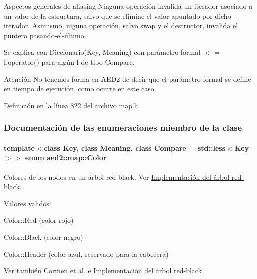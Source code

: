 \begin{DoxyParagraph}{\-Aspectos generales de aliasing}
\-Ninguna operación invalida un iterador asociado a un valor de la estructura, salvo que se elimine el valor apuntado por dicho iterador. \-Asimismo, niguna operación, salvo swap y el destructor, invalida el puntero pasando-\/el-\/último.
\end{DoxyParagraph}
\begin{DoxyParagraph}{\-Se explica con}
\-Diccionario(\-Key, \-Meaning) con parámetro formal $<$ = f.\-operator() para algún f de tipo \-Compare.
\end{DoxyParagraph}
\begin{DoxyAttention}{\-Atención}
\-No tenemos forma en \-A\-E\-D2 de decir que el parámetro formal se define en tiempo de ejecución, como ocurre en este caso. 
\end{DoxyAttention}


\-Definición en la línea \hyperlink{map_8h_source_l00822}{822} del archivo \hyperlink{map_8h_source}{map.\-h}.



\subsubsection{\-Documentación de las enumeraciones miembro de la clase}
\hypertarget{classaed2_1_1map_a6d62a415a4b9d320b30cada4ebcf9f5b_a6d62a415a4b9d320b30cada4ebcf9f5b}{
\paragraph[{\-Color}]{\setlength{\rightskip}{0pt plus 5cm}template$<$class \-Key, class \-Meaning, class \-Compare = std\-::less$<$\-Key$>$$>$ enum {\bf aed2\-::map\-::\-Color}}}\label{classaed2_1_1map_a6d62a415a4b9d320b30cada4ebcf9f5b_a6d62a415a4b9d320b30cada4ebcf9f5b}


\-Colores de los nodos en un árbol red-\/black. \-Ver \hyperlink{Implementacion}{\-Implementación del árbol red-\/black}. 

\-Valores validos\-: \begin{DoxyItemize}
\item \-Color\-::\-Red (color rojo) \item \-Color\-::\-Black (color negro) \item \-Color\-::\-Header (color azul, reservado para la cabecera)\end{DoxyItemize}
\begin{DoxySeeAlso}{\-Ver también}
\-Cormen et al. \cite{CormenLeisersonRivestStein2009} e \hyperlink{Implementacion}{\-Implementación del árbol red-\/black} 
\end{DoxySeeAlso}


